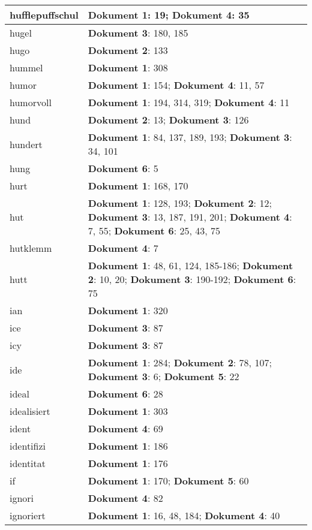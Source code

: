 \documentclass[a5paper]{article}
\begin{document}
\begin{longtable}[l]{|l|p{3in}|}
\hline
hufflepuffschul & \textbf{Dokument 1}: 19; \textbf{Dokument 4}: 35 \\
\hline
hugel & \textbf{Dokument 3}: 180, 185 \\
\hline
hugo & \textbf{Dokument 2}: 133 \\
\hline
hummel & \textbf{Dokument 1}: 308 \\
\hline
humor & \textbf{Dokument 1}: 154; \textbf{Dokument 4}: 11, 57 \\
\hline
humorvoll & \textbf{Dokument 1}: 194, 314, 319; \textbf{Dokument 4}: 11 \\
\hline
hund & \textbf{Dokument 2}: 13; \textbf{Dokument 3}: 126 \\
\hline
hundert & \textbf{Dokument 1}: 84, 137, 189, 193; \textbf{Dokument 3}: 34, 101 \\
\hline
hung & \textbf{Dokument 6}: 5 \\
\hline
hurt & \textbf{Dokument 1}: 168, 170 \\
\hline
hut & \textbf{Dokument 1}: 128, 193; \textbf{Dokument 2}: 12; \textbf{Dokument 3}: 13, 187, 191, 201; \textbf{Dokument 4}: 7, 55; \textbf{Dokument 6}: 25, 43, 75 \\
\hline
hutklemm & \textbf{Dokument 4}: 7 \\
\hline
hutt & \textbf{Dokument 1}: 48, 61, 124, 185-186; \textbf{Dokument 2}: 10, 20; \textbf{Dokument 3}: 190-192; \textbf{Dokument 6}: 75 \\
\hline
ian & \textbf{Dokument 1}: 320 \\
\hline
ice & \textbf{Dokument 3}: 87 \\
\hline
icy & \textbf{Dokument 3}: 87 \\
\hline
ide & \textbf{Dokument 1}: 284; \textbf{Dokument 2}: 78, 107; \textbf{Dokument 3}: 6; \textbf{Dokument 5}: 22 \\
\hline
ideal & \textbf{Dokument 6}: 28 \\
\hline
idealisiert & \textbf{Dokument 1}: 303 \\
\hline
ident & \textbf{Dokument 4}: 69 \\
\hline
identifizi & \textbf{Dokument 1}: 186 \\
\hline
identitat & \textbf{Dokument 1}: 176 \\
\hline
if & \textbf{Dokument 1}: 170; \textbf{Dokument 5}: 60 \\
\hline
ignori & \textbf{Dokument 4}: 82 \\
\hline
ignoriert & \textbf{Dokument 1}: 16, 48, 184; \textbf{Dokument 4}: 40 \\

\end{longtable}
\end{document}
